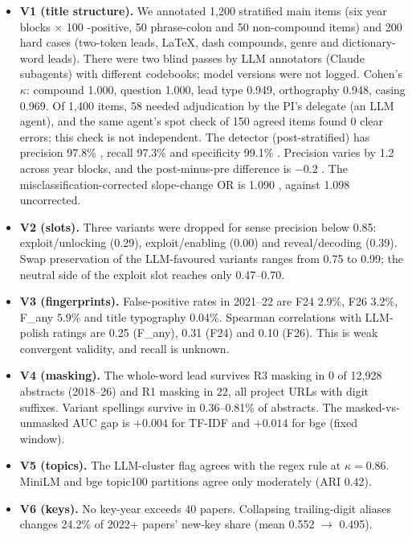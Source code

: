 \begin{itemize}
\item \textbf{V1 (title structure).} We annotated 1,200 stratified main items (six year blocks $\times$ 100 \NAME-positive, 50 phrase-colon and 50 non-compound items) and 200 hard cases (two-token leads, LaTeX, dash compounds, genre and dictionary-word leads). There were two blind passes by LLM annotators (Claude subagents) with different codebooks; model versions were not logged. Cohen's $\kappa$: compound 1.000, question 1.000, lead type 0.949, orthography 0.948, casing 0.969. Of 1,400 items, 58 needed adjudication by the PI's delegate (an LLM agent), and the same agent's spot check of 150 agreed items found 0 clear errors; this check is not independent. The \NAME{} detector (post-stratified) has precision 97.8\% , recall 97.3\%  and specificity 99.1\% . Precision varies by 1.2\pp{} across year blocks, and the post-minus-pre difference is $-0.2$\pp{} . The misclassification-corrected slope-change OR is 1.090 , against 1.098 uncorrected.
\item \textbf{V2 (slots).} Three variants were dropped for sense precision below 0.85: exploit/unlocking (0.29), exploit/enabling (0.00) and reveal/decoding (0.39). Swap preservation of the LLM-favoured variants ranges from 0.75 to 0.99; the neutral side of the exploit slot reaches only 0.47--0.70.
\item \textbf{V3 (fingerprints).} False-positive rates in 2021--22 are F24 2.9\%, F26 3.2\%, F\_any 5.9\% and title typography 0.04\%. Spearman correlations with LLM-polish ratings are 0.25 (F\_any), 0.31 (F24) and 0.10 (F26). This is weak convergent validity, and recall is unknown.
\item \textbf{V4 (masking).} The whole-word lead survives R3 masking in 0 of 12,928 \NAME{} abstracts (2018--26) and R1 masking in 22, all project URLs with digit suffixes. Variant spellings survive in 0.36--0.81\% of abstracts. The masked-vs-unmasked AUC gap is $+0.004$ for TF-IDF and $+0.014$ for bge (fixed window).
\item \textbf{V5 (topics).} The LLM-cluster flag agrees with the regex rule at $\kappa=0.86$. MiniLM and bge topic100 partitions agree only moderately (ARI 0.42).
\item \textbf{V6 (keys).} No key-year exceeds 40 papers. Collapsing trailing-digit aliases changes 24.2\% of 2022+ papers' new-key share (mean 0.552 $\rightarrow$ 0.495).
\end{itemize}


